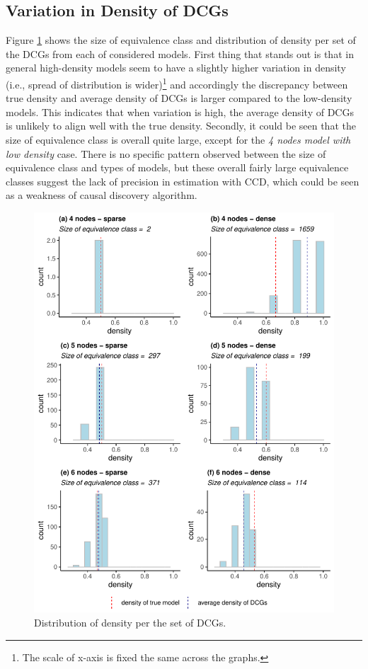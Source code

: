\documentclass[
]{article}
\begin{document}
\hypertarget{variation-in-density-of-dcgs}{%
\subsection{Variation in Density of DCGs}\label{variation-in-density-of-dcgs}}

\noindent Figure \ref{fig:density-variation} shows the size of equivalence class and distribution of density per set of the DCGs from each of considered models. First thing that stands out is that in general high-density models seem to have a slightly higher variation in density (i.e., spread of distribution is wider)\footnote{The scale of x-axis is fixed the same across the graphs.} and accordingly the discrepancy between true density and average density of DCGs is larger compared to the low-density models. This indicates that when variation is high, the average density of DCGs is unlikely to align well with the true density. Secondly, it could be seen that the size of equivalence class is overall quite large, except for the \emph{4 nodes model with low density} case. There is no specific pattern observed between the size of equivalence class and types of models, but these overall fairly large equivalence classes suggest the lack of precision in estimation with CCD, which could be seen as a weakness of causal discovery algorithm.

\begin{figure}

{\centering \includegraphics[width=0.8\linewidth]{img/density_variation} 

}

\caption{Distribution of density per the set of DCGs.}\label{fig:density-variation}
\end{figure}
\end{document}
